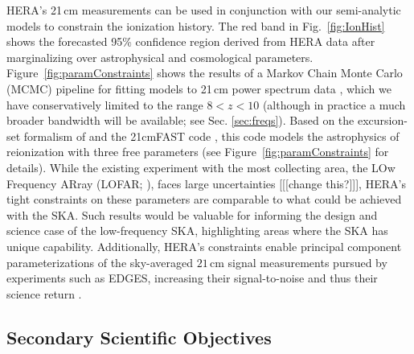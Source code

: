 \documentclass[preprint,11pt]{aastex}
\begin{document}
HERA's 21\,cm measurements can be used in conjunction with our semi-analytic models to constrain the ionization history. 
The red band in Fig.~\ref{fig:IonHist} shows the forecasted 95\% confidence region derived from HERA data after marginalizing over astrophysical and cosmological parameters.
Figure~\ref{fig:paramConstraints} shows the results of a Markov Chain Monte
Carlo (MCMC) pipeline for fitting models to 21\,cm power spectrum data \citep{greig_and_mesinger2015}, which we have conservatively limited to the range $8 < z < 10$ (although in practice a much broader bandwidth will be available; see Sec. \ref{sec:freqs}).
Based on the excursion-set formalism of
\citet{furlanetto_et_al2004} and the 21cmFAST code \citep{mesinger_et_al2011},
this code models the astrophysics of
reionization with three free parameters (see Figure~\ref{fig:paramConstraints} for details). 
While the existing experiment with the most collecting area, 
the LOw Frequency ARray (LOFAR; \citealt{2013A&A...556A...2V, yatawatta_et_al2013}),
faces large
uncertainties [[[change this?]]], 
HERA's tight constraints on these parameters are comparable
to what could be achieved with the SKA.  Such results would be valuable for
informing the design and science case of the low-frequency SKA, highlighting areas where the SKA has unique capability.
Additionally, HERA's constraints enable principal component parameterizations of the
sky-averaged $21\,\textrm{cm}$ signal measurements pursued by experiments such as EDGES, increasing their signal-to-noise and thus their science return \citep{liu_parsons2015}.


\subsection{Secondary Scientific Objectives}%
\end{document}
